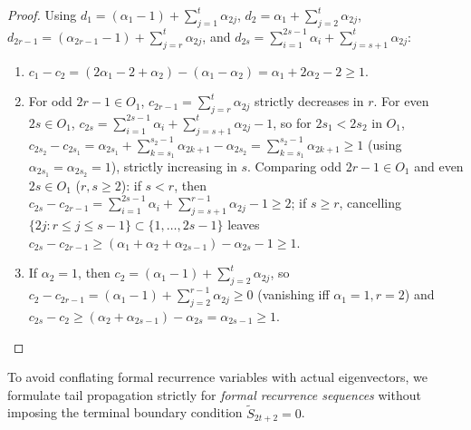\documentclass[11pt,a4paper]{article}
\theoremstyle{definition}
\begin{document}
\begin{proof}
  Using $d_1 = (\alpha_1-1) + \sum_{j=1}^t \alpha_{2j}$, $d_2 = \alpha_1 + \sum_{j=2}^t \alpha_{2j}$, $d_{2r-1} = (\alpha_{2r-1}-1) + \sum_{j=r}^t \alpha_{2j}$, and $d_{2s} = \sum_{i=1}^{2s-1}\alpha_i + \sum_{j=s+1}^t \alpha_{2j}$:
  \begin{enumerate}
    \item $c_1 - c_2 = (2\alpha_1 - 2 + \alpha_2) - (\alpha_1 - \alpha_2) = \alpha_1 + 2\alpha_2 - 2 \ge 1$.
    \item For odd $2r-1 \in O_1$, $c_{2r-1} = \sum_{j=r}^t \alpha_{2j}$ strictly decreases in $r$. For even $2s \in O_1$, $c_{2s} = \sum_{i=1}^{2s-1}\alpha_i + \sum_{j=s+1}^t \alpha_{2j} - 1$, so for $2s_1 < 2s_2$ in $O_1$, $c_{2s_2} - c_{2s_1} = \alpha_{2s_1} + \sum_{k=s_1}^{s_2-1}\alpha_{2k+1} - \alpha_{2s_2} = \sum_{k=s_1}^{s_2-1}\alpha_{2k+1} \ge 1$ (using $\alpha_{2s_1} = \alpha_{2s_2} = 1$), strictly increasing in $s$. Comparing odd $2r-1 \in O_1$ and even $2s \in O_1$ ($r,s \ge 2$): if $s < r$, then $c_{2s} - c_{2r-1} = \sum_{i=1}^{2s-1}\alpha_i + \sum_{j=s+1}^{r-1}\alpha_{2j} - 1 \ge 2$; if $s \ge r$, cancelling $\{2j : r \le j \le s-1\} \subset \{1,\dots,2s-1\}$ leaves $c_{2s} - c_{2r-1} \ge (\alpha_1 + \alpha_2 + \alpha_{2s-1}) - \alpha_{2s} - 1 \ge 1$.
    \item If $\alpha_2 = 1$, then $c_2 = (\alpha_1 - 1) + \sum_{j=2}^t \alpha_{2j}$, so $c_2 - c_{2r-1} = (\alpha_1 - 1) + \sum_{j=2}^{r-1}\alpha_{2j} \ge 0$ (vanishing iff $\alpha_1=1, r=2$) and $c_{2s} - c_2 \ge (\alpha_2 + \alpha_{2s-1}) - \alpha_{2s} = \alpha_{2s-1} \ge 1$. \qedhere
  \end{enumerate}
\end{proof}

To avoid conflating formal recurrence variables with actual eigenvectors, we formulate tail propagation strictly for \emph{formal recurrence sequences} without imposing the terminal boundary condition $\tilde{S}_{2t+2} = 0$.
\end{document}
